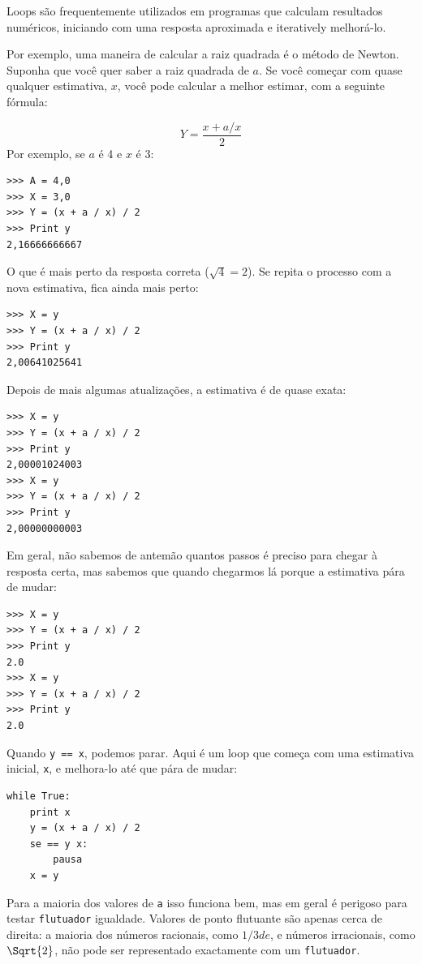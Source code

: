 \documentclass[10pt]{book}
\begin{document}
{Loops são frequentemente utilizados em programas que calculam
resultados numéricos, iniciando com uma resposta aproximada e
iteratively melhorá-lo.

Por exemplo, uma maneira de calcular a raiz quadrada é o método de Newton.
Suponha que você quer saber a raiz quadrada de $ a $. Se você começar
com quase qualquer estimativa, $ x $, você pode calcular a melhor
estimar, com a seguinte fórmula:

\[Y = \frac {x + a / x} {2} \]
%
Por exemplo, se $ a $ é 4 e $ x $ é 3:

\begin{verbatim}
>>> A = 4,0
>>> X = 3,0
>>> Y = (x + a / x) / 2
>>> Print y
2,16666666667
\end{verbatim}
%
O que é mais perto da resposta correta ($ \sqrt {4} = 2 $). Se
repita o processo com a nova estimativa, fica ainda mais perto:

\begin{verbatim}
>>> X = y
>>> Y = (x + a / x) / 2
>>> Print y
2,00641025641
\end{verbatim}
%
Depois de mais algumas atualizações, a estimativa é de quase exata:

\begin{verbatim}
>>> X = y
>>> Y = (x + a / x) / 2
>>> Print y
2,00001024003
>>> X = y
>>> Y = (x + a / x) / 2
>>> Print y
2,00000000003
\end{verbatim}
%
Em geral, não sabemos de antemão quantos passos é preciso
para chegar à resposta certa, mas sabemos que quando chegarmos lá
porque a estimativa
pára de mudar:

\begin{verbatim}
>>> X = y
>>> Y = (x + a / x) / 2
>>> Print y
2.0
>>> X = y
>>> Y = (x + a / x) / 2
>>> Print y
2.0
\end{verbatim}
%
Quando {\tt y == x}, podemos parar. Aqui é um loop que começa
com uma estimativa inicial, {\tt x}, e melhora-lo até que
pára de mudar:

\begin{verbatim}
while True:
    print x
    y = (x + a / x) / 2
    se == y x:
        pausa
    x = y
\end{verbatim}
%
Para a maioria dos valores de {\tt a} isso funciona bem, mas em geral é
perigoso para testar {\tt flutuador} igualdade.
Valores de ponto flutuante são apenas cerca de direita:
a maioria dos números racionais, como $ 1/3 de $, e números irracionais, como
$ \Sqrt {2} $, não pode ser representado exactamente com um {\tt flutuador}.

}
\end{document}
